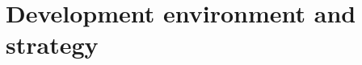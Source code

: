 \documentclass[draftmode,draftwater]{memarticle}
\begin{document}


\section{Development environment and strategy}



\end{document}
